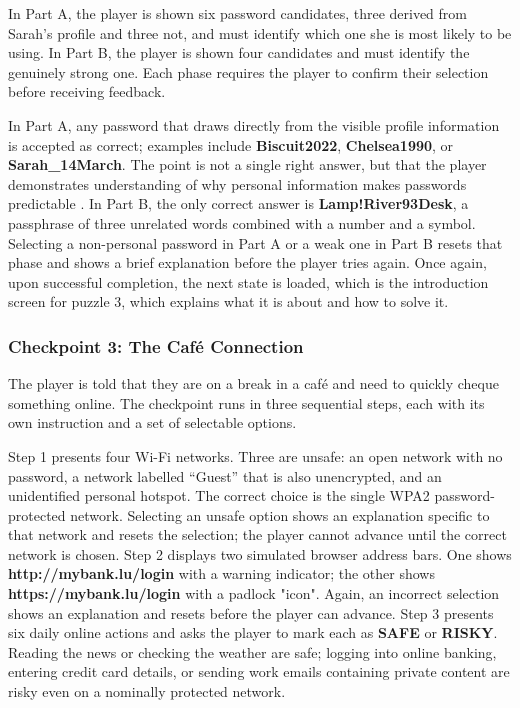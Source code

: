 \documentclass[sigconf, authorversion=true, nonacm=true]{acmart}%
\begin{document}
In Part A, the player is shown six password candidates, three derived from Sarah's profile and three not, and must identify which one she is most likely to be using. In Part B, the player is shown four candidates and must identify the genuinely strong one. Each phase requires the player to confirm their selection before receiving feedback.

In Part A, any password that draws directly from the visible profile information is accepted as correct; examples include
\textbf{Biscuit2022}, \textbf{Chelsea1990}, or \textbf{Sarah\_14March}. The point is not a single right answer, but
that the player demonstrates understanding of why personal information makes passwords predictable \cite{spatafora_educational_2024, verizon_dbir_2025}. In Part B, the only correct answer is \textbf{Lamp!River93Desk}, a passphrase of three unrelated words combined with a number and a symbol. Selecting a non-personal password in Part A or a weak one in Part B resets that phase and shows a brief explanation before the player tries again. Once again, upon successful completion, the next state is loaded, which is the introduction screen for puzzle 3, which explains what it is about and how to solve it. 


\subsubsection{Checkpoint 3: The Café Connection}

The player is told that they are on a break in a café and need to quickly cheque something online. The checkpoint runs in three sequential steps, each with its own instruction and a set of selectable options.

Step 1 presents four Wi-Fi networks. Three are unsafe: an open network with no password, a network labelled ``Guest'' that is also unencrypted, and an unidentified personal hotspot. The correct choice is the single WPA2 password-protected network. Selecting an unsafe option shows an explanation specific to that network and resets the selection; the player cannot advance until the correct network is chosen. 
Step 2 displays two simulated browser address bars. One shows \textbf{http://mybank.lu/login} with a warning indicator; the other shows \textbf{https://mybank.lu/login} with a padlock "icon". Again, an incorrect selection shows an explanation and resets before the player can advance. 
Step 3 presents six daily online actions and asks the player to mark each as \textbf{SAFE} or \textbf{RISKY}. Reading the news or checking the weather are safe; logging into online banking, entering credit card details, or sending work emails containing private content are risky even on a nominally protected network.
\end{document}
